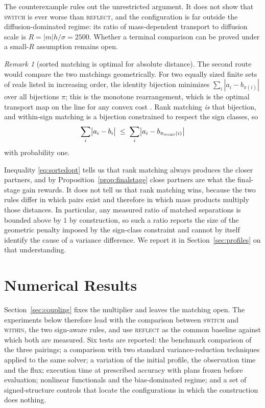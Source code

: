 \documentclass[smallextended,nospthms]{svjour3}
\theoremstyle{plain}
\theoremstyle{definition}
\theoremstyle{remark}
\newtheorem{remark}[proposition]{Remark}
\numberwithin{equation}{section}
\newcommand{\refl}{\textnormal{\textsc{reflect}}}
\newcommand{\swi}{\textnormal{\textsc{switch}}}
\newcommand{\wit}{\textnormal{\textsc{within}}}
\begin{document}
The counterexample rules out the unrestricted argument. It does not show that
\swi{} is ever worse than \refl{}, and the configuration is far outside the
diffusion-dominated regime: its ratio of mass-dependent transport to diffusion
scale is $R=|m|h/\sigma=2500$. Whether a terminal comparison can be proved under
a small-$R$ assumption remains open.

\begin{remark}[sorted matching is optimal for absolute distance]
\label{rem:sorted}
The second route would compare the two matchings geometrically. For two equally
sized finite sets of reals listed in increasing order, the identity bijection
minimizes $\sum_i|a_i-b_{\pi(i)}|$ over all bijections $\pi$; this is the
monotone rearrangement, which is the optimal transport map on the line for any
convex cost \citep{villani2003}. Rank matching \emph{is} that bijection, and
within-sign matching is a bijection constrained to respect the sign classes, so
\begin{equation}
  \sum_i\bigl|a_i-b_i\bigr|\;\le\;\sum_i\bigl|a_i-b_{\pi_{\wit}(i)}\bigr|
  \label{eq:sortedopt}
\end{equation}
with probability one.
\end{remark}

Inequality \eqref{eq:sortedopt} tells us that rank matching always produces the
closer partners, and by Proposition~\ref{prop:finalstage} close partners are
what the final-stage gain rewards. It does not tell us that rank matching wins,
because the two rules differ in which pairs exist and therefore in which mass
products multiply those distances. In particular, any measured ratio of
matched separations is bounded above by $1$ by construction, so such a ratio
reports the size of the geometric penalty imposed by the sign-class constraint
and cannot by itself identify the cause of a variance difference. We report it
in Section~\ref{sec:profiles} on that understanding.

\section{Numerical Results}
\label{sec:numerics}

Section~\ref{sec:coupling} fixes the multiplier and leaves the matching open.
The experiments below therefore lead with the comparison between \swi{} and
\wit{}, the two sign-aware rules, and use \refl{} as the common baseline
against which both are measured. Six tests are reported: the benchmark
comparison of the three pairings; a comparison with two standard
variance-reduction techniques applied to the same solver; a variation of the
initial profile, the observation time and the flux; execution time at
prescribed accuracy with plans frozen before evaluation; nonlinear functionals
and the bias-dominated regime; and a set of signed-structure controls that
locate the configurations in which the construction does nothing.
\end{document}
